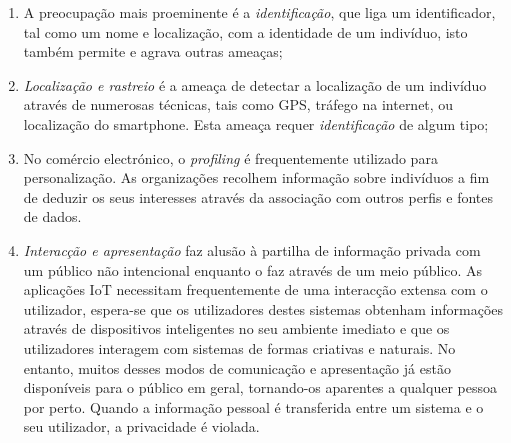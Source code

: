 \documentclass[conference]{IEEEtran}
\begin{document}
\begin{enumerate}
    \item
    A preocupação mais proeminente é a \textit{identificação}, que liga
    um identificador, tal como um nome e localização, com a identidade de
    um indivíduo, isto também permite e agrava outras ameaças;

    \item
    \textit{Localização e rastreio} é a ameaça de detectar a localização
    de um indivíduo através de numerosas técnicas, tais como GPS, tráfego
    na internet, ou localização do smartphone. Esta ameaça requer \textit{identificação}
    de algum tipo;

    \item
    No comércio electrónico, o \textit{profiling} é frequentemente utilizado
    para personalização. As organizações recolhem informação sobre indivíduos
    a fim de deduzir os seus interesses através da associação com outros perfis
    e fontes de dados.

    \item
    \textit{Interacção e apresentação} faz alusão à partilha de informação
    privada com um público não intencional enquanto o faz através de um meio
    público. As aplicações IoT necessitam frequentemente de uma interacção extensa
    com o utilizador, espera-se que os utilizadores destes sistemas obtenham
    informações através de dispositivos inteligentes no seu ambiente imediato
    e que os utilizadores interagem com sistemas de formas criativas e naturais.
    No entanto, muitos desses modos de comunicação e apresentação já estão
    disponíveis para o público em geral, tornando-os aparentes a qualquer pessoa
    por perto. Quando a informação pessoal é transferida entre um sistema e
    o seu utilizador, a privacidade é violada.


\end{enumerate}
\end{document}
